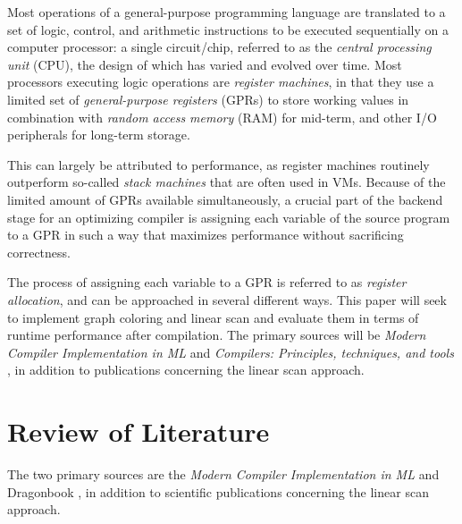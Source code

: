 \documentclass{article}
\begin{document}
Most operations of a general-purpose programming language are translated to a set of logic,  control, and arithmetic instructions to be executed sequentially on a computer processor: a single circuit/chip, referred to as the \textit{central processing unit} (CPU), the design of which has varied and evolved over time. Most processors executing logic operations are \textit{register machines}, in that they use a limited set of \textit{general-purpose registers} (GPRs) to store working values in combination with \textit{random access memory} (RAM) for mid-term, and other I/O peripherals for long-term storage.

This can largely be attributed to performance, as register machines routinely outperform so-called \textit{stack machines} \parencite{ShiYunhe2008VmsS} that are often used in VMs.
Because of the limited amount of GPRs available simultaneously, a crucial part of the backend stage for an optimizing compiler is assigning each variable  of the source program to a GPR in such a way that maximizes performance without sacrificing correctness.

The process of assigning each variable to a GPR is referred to as \textit{register allocation}, and can be approached in several different ways. This paper will seek to implement graph coloring and linear scan and evaluate them in terms of runtime performance after compilation. %
The primary sources will be \textit{Modern Compiler Implementation in ML} \parencite{tiger} and \textit{Compilers: Principles, techniques, and tools} \parencite{dragon}, in addition to publications concerning the linear scan approach.




\section{Review of Literature}

The two primary sources are the \textit{Modern Compiler Implementation in ML} \cite{tiger} and Dragonbook \cite{dragon}, in addition to scientific publications concerning the linear scan approach.
\end{document}
